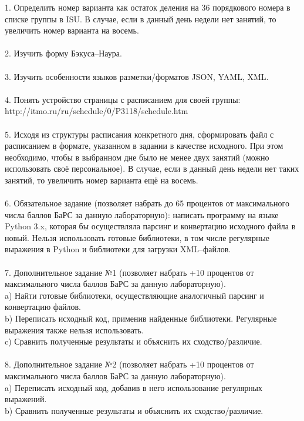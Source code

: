 \documentclass[12pt]{article}
\begin{document}
1. Определить номер варианта как остаток деления на 36 порядкового номера в списке группы в ISU. В случае, если в данный день недели нет занятий, то увеличить номер варианта на восемь.\\
\\
2. Изучить форму Бэкуса--Наура.\\
\\
3. Изучить особенности языков разметки/форматов JSON, YAML, XML.\\
\\
4. Понять устройство страницы с расписанием для своей группы:\\
http://itmo.ru/ru/schedule/0/P3118/schedule.htm\\
\\
5. Исходя из структуры расписания конкретного дня, сформировать файл с расписанием в формате, указанном в задании в качестве исходного. При этом необходимо, чтобы в выбранном дне было не менее двух занятий (можно использовать своё персональное). В случае, если в данный день недели нет таких занятий, то увеличить номер варианта ещё на восемь.\\
\\
6. Обязательное задание (позволяет набрать до 65 процентов от максимального числа баллов БаРС за данную лабораторную): написать программу на языке Python 3.x, которая бы осуществляла парсинг и конвертацию исходного файла в новый. Нельзя использовать готовые библиотеки, в том числе регулярные выражения в Python и библиотеки для загрузки XML--файлов.\\
\\
7. Дополнительное задание №1 (позволяет набрать +10 процентов от максимального числа баллов БаРС за данную лабораторную).\\
\indent a) Найти готовые библиотеки, осуществляющие аналогичный парсинг и конвертацию файлов.\\
\indent b) Переписать исходный код, применив найденные библиотеки. Регулярные выражения также нельзя использовать.\\
\indent c) Сравнить полученные результаты и объяснить их сходство/различие.\\
\\
8. Дополнительное задание №2 (позволяет набрать +10 процентов от максимального числа баллов БаРС за данную лабораторную).\\
\indent a) Переписать исходный код, добавив в него использование регулярных выражений.\\
\indent b) Сравнить полученные результаты и объяснить их сходство/различие.\\
\end{document}
